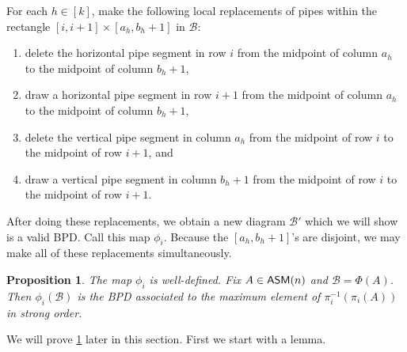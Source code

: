\documentclass[12 pt]{amsart}
\newtheorem{proposition}[Theorem]{Proposition}
\numberwithin{equation}{section}
\newcommand{\asmtobpd}{\Phi}
\theoremstyle{remark}
\newcommand{\asm}{{\sf ASM}}
\begin{document}
For each $h\in[k]$, make the following local replacements of pipes within the rectangle $[i,i+1]\times[a_h,b_h+1]$ in $\mathcal B$:
\begin{enumerate}
    \item delete the horizontal pipe segment in row $i$ from the midpoint of column $a_h$ to the midpoint of column $b_h+1$,
    \item draw a horizontal pipe segment in row $i+1$ from the midpoint of column $a_h$ to the midpoint of column $b_h+1$,
    \item delete the vertical pipe segment in column $a_h$ from the midpoint of row $i$ to the midpoint of row $i+1$, and
    \item draw a vertical pipe segment in column $b_h+1$ from the midpoint of row $i$ to the midpoint of row $i+1$.
\end{enumerate}
After doing these replacements, we obtain a new diagram $\mathcal B'$ which we will show is a valid BPD. Call this map $\phi_i$. Because the $[a_h,b_h+1]$'s are disjoint, we may make all of these replacements simultaneously.

\begin{proposition}
\label{prop:droppablebpd}
    The map $\phi_i$ is well-defined. Fix $A \in \asm(n)$ and $\mathcal{B}=\asmtobpd(A)$. Then $\phi_i(\mathcal B)$ is the BPD associated to the  maximum element of $\pi_i^{-1}(\pi_i(A))$ in strong order.
\end{proposition}

We will prove \cref{prop:droppablebpd} later in this section.  First we start with a lemma.
\end{document}
